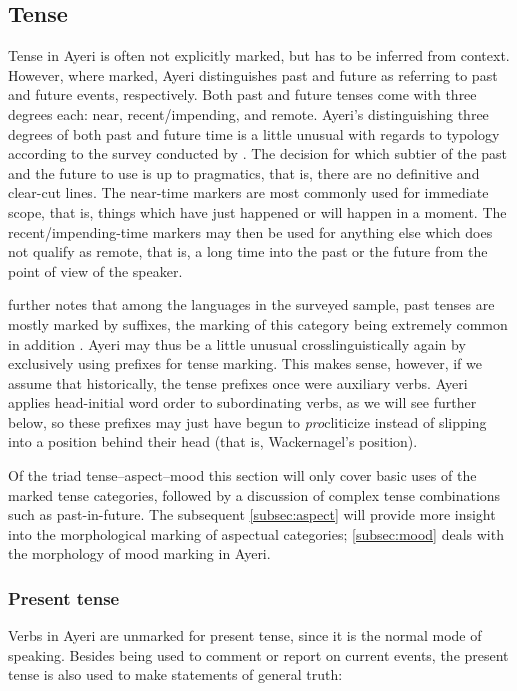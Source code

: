 
\subsection{Tense}
\label{subsec:tense}

Tense in Ayeri is often not explicitly marked, but has to be inferred from
context. However, where marked, Ayeri distinguishes past and future as
referring to past and future events, respectively. Both past and future tenses
come with three degrees each: near, recent/impending, and remote. Ayeri's
distinguishing three degrees of both past and future time is a little unusual
with regards to typology according to the survey conducted by
\citet[127]{dahl1985}. The decision for which subtier of the past and the
future to use is up to pragmatics, that is, there are no definitive and 
clear-cut lines. The near-time markers are most commonly used for immediate 
scope, that is, things which have just happened or will happen in a moment. 
The recent/impending-time markers may then be used for anything else which 
does not qualify as remote, that is, a long time into the past or the future 
from the point of view of the speaker.

\citet{dahl1985} further notes that among the languages in the surveyed
sample, past tenses are mostly marked by suffixes, the marking of this category
being extremely common in addition \citep[117]{dahl1985}. Ayeri may thus be a little unusual
crosslinguistically again by exclusively using prefixes for tense marking. This
makes sense, however, if we assume that historically, the tense prefixes once
were auxiliary verbs. Ayeri applies head-initial word order to subordinating
verbs, as we will see further below, so these prefixes may just have begun to
\emph{pro}cliticize instead of slipping into a position behind their head (that
is, Wackernagel's position).

Of the triad tense--aspect--mood this section will only cover basic uses of 
the marked tense categories, followed by a discussion of complex tense 
combinations such as past-in-future. The subsequent \autoref{subsec:aspect} 
will provide more insight into the morphological marking of aspectual 
categories; \autoref{subsec:mood} deals with the morphology of mood marking in 
Ayeri.

\subsubsection{Present tense}
Verbs in Ayeri are unmarked for present tense, since it is the normal mode of 
speaking. Besides being used to comment or report on current events, the 
present tense is also used to make statements of general truth:

